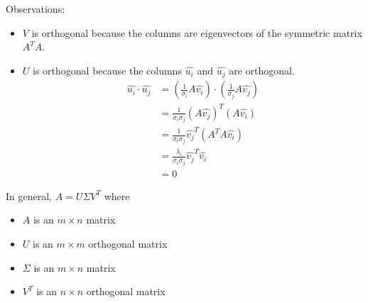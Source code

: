 \documentclass{math}
\begin{document}
Observations:
\begin{itemize}
  \item \( V \) is orthogonal because the columns are eigenvectors of the
    symmetric matrix \( A^TA \).
  \item \( U \) is orthogonal because the columns \( \hat{u_i} \) and
    \( \hat{u_j} \) are orthogonal.
  \begin{align*}
    \hat{u_i}\cdot\hat{u_j} &= \left(\frac{1}{\sigma_i}A\hat{v_i}\right)\cdot
      \left(\frac{1}{\sigma_j}A\hat{v_j}\right) \\
    &= \frac{1}{\sigma_i\sigma_j}(A\hat{v_j})^T(A\hat{v_i}) \\
    &= \frac{1}{\sigma_i\sigma_j}\hat{v_j}^T(A^TA\hat{v_i}) \\
    &= \frac{\lambda_i}{\sigma_i\sigma_j}\hat{v_j}^T\hat{v_i} \\
    &= 0
  \end{align*}
\end{itemize}
In general, \( A = U\Sigma V^T \) where
\begin{itemize}
  \item \( A \) is an \( m\times n \) matrix
  \item \( U \) is an \( m\times m \) orthogonal matrix
  \item \( \Sigma \) is an \( m\times n \) matrix
  \item \( V^T \) is an \( n\times n \) orthogonal matrix
\end{itemize}
\end{document}
